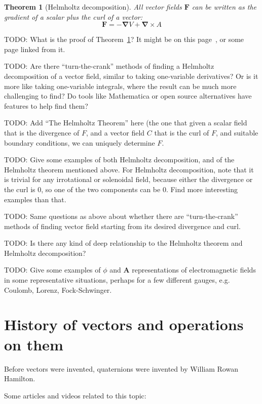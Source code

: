 \documentclass[a4paper]{article}
\theoremstyle{plain}
\newtheorem{theorem}{Theorem}
\theoremstyle{definition}
\newcommand{\vect}[1]{\textbf{#1}}
\newcommand{\del}{\bm{\nabla}}
\begin{document}
\begin{theorem}[Helmholtz decomposition]
\label{thm:helmholtzdecomposition}
All vector fields $\vect{F}$ can be written as the gradient of a
scalar plus the curl of a vector:
\begin{equation}
\vect{F} = - \del V + \del \times A
\end{equation}
\end{theorem}
TODO: What is the proof of Theorem~\ref{thm:helmholtzdecomposition}?
It might be on this page~\cite{WikipediaHelmholtzDecomposition}, or
some page linked from it.

TODO: Are there ``turn-the-crank'' methods of finding a Helmholtz
decomposition of a vector field, similar to taking one-variable
derivatives?  Or is it more like taking one-variable integrals, where
the result can be much more challenging to find?  Do tools like
Mathematica or open source alternatives have features to help find
them?

TODO: Add ``The Helmholtz Theorem'' here (the one that given a scalar
field that is the divergence of $F$, and a vector field $C$ that is
the curl of $F$, and suitable boundary conditions, we can uniquely
determine $F$.

TODO: Give some examples of both Helmholtz decomposition, and of the
Helmholtz theorem mentioned above.  For Helmholtz decomposition, note
that it is trivial for any irrotational or solenoidal field, because
either the divergence or the curl is 0, so one of the two components
can be 0.  Find more interesting examples than that.

TODO: Same questions as above about whether there are
``turn-the-crank'' methods of finding vector field starting from its
desired divergence and curl.

TODO: Is there any kind of deep relationship to the Helmholtz theorem
and Helmholtz decomposition?

TODO: Give some examples of $\phi$ and $\vect{A}$ representations of
electromagnetic fields in some representative situations, perhaps for
a few different gauges, e.g. Coulomb, Lorenz, Fock-Schwinger.


\section{History of vectors and operations on them}

Before vectors were invented, quaternions were invented by William
Rowan Hamilton.

Some articles and videos related to this topic:
\end{document}
